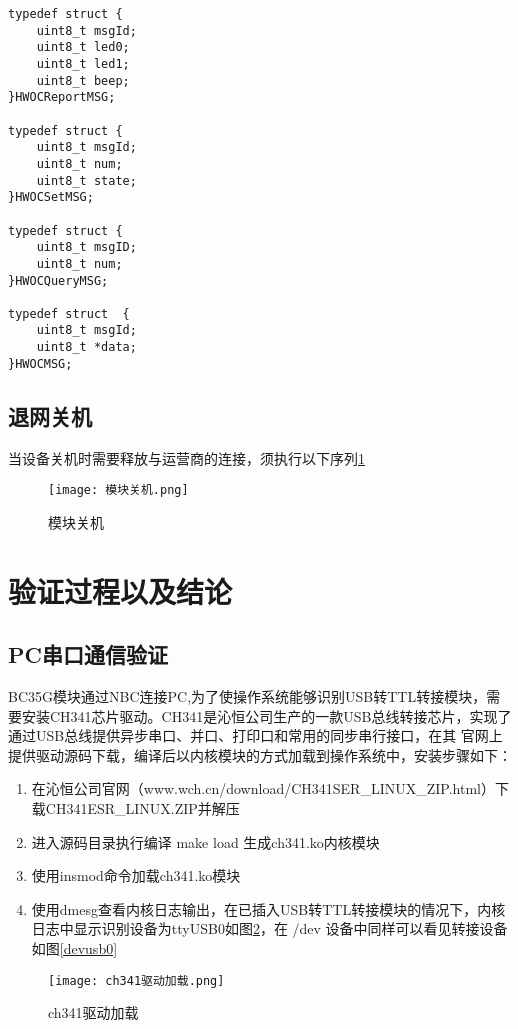 \begin{lstlisting}
typedef struct {
    uint8_t msgId;
    uint8_t led0;
    uint8_t led1;
    uint8_t beep;
}HWOCReportMSG;

typedef struct {
    uint8_t msgId;
    uint8_t num;
    uint8_t state;
}HWOCSetMSG;

typedef struct {
    uint8_t msgID;
    uint8_t num;
}HWOCQueryMSG;

typedef struct  {
    uint8_t msgId;
    uint8_t *data;
}HWOCMSG;
\end{lstlisting}



\subsection{退网关机}

当设备关机时需要释放与运营商的连接，须执行以下序列\ref{模块关机}
\begin{figure}[H]
    \centering
	\texttt{[image: 模块关机.png]}
	\caption{模块关机}
	\label{模块关机}
\end{figure}

\section{验证过程以及结论}

\subsection{PC串口通信验证}
BC35G模块通过NBC连接PC,为了使操作系统能够识别USB转TTL转接模块，需要安装CH341芯片驱动。CH341是沁恒公司生产的一款USB总线转接芯片，实现了通过USB总线提供异步串口、并口、打印口和常用的同步串行接口，在其
官网上提供驱动源码下载，编译后以内核模块的方式加载到操作系统中，安装步骤如下：
\begin{enumerate}
\item 在沁恒公司官网（www.wch.cn/download/CH341SER\_LINUX\_ZIP.html）下载CH341ESR\_LINUX.ZIP并解压
\item 进入源码目录执行编译 make load 生成ch341.ko内核模块
\item 使用insmod命令加载ch341.ko模块
\item 使用dmesg查看内核日志输出，在已插入USB转TTL转接模块的情况下，内核日志中显示识别设备为ttyUSB0如图\ref{ch341驱动加载}，在 /dev 设备中同样可以看见转接设备如图\ref{devusb0}
\end{enumerate}

\begin{figure}[H]
    \centering
	\texttt{[image: ch341驱动加载.png]}
	\caption{ch341驱动加载}
	\label{ch341驱动加载}
\end{figure}

